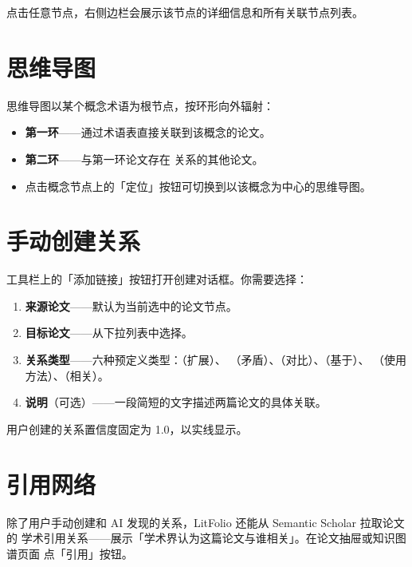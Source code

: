 点击任意节点，右侧边栏会展示该节点的详细信息和所有关联节点列表。

\section{思维导图}


思维导图以某个概念术语为根节点，按环形向外辐射：

\begin{itemize}
  \item \textbf{第一环}——通过术语表直接关联到该概念的论文。
  \item \textbf{第二环}——与第一环论文存在  关系的其他论文。
  \item 点击概念节点上的「定位」按钮可切换到以该概念为中心的思维导图。
\end{itemize}

\section{手动创建关系}

工具栏上的「添加链接」按钮打开创建对话框。你需要选择：

\begin{enumerate}
  \item \textbf{来源论文}——默认为当前选中的论文节点。
  \item \textbf{目标论文}——从下拉列表中选择。
  \item \textbf{关系类型}——六种预定义类型：（扩展）、
    （矛盾）、（对比）、（基于）、
    （使用方法）、（相关）。
  \item \textbf{说明}（可选）——一段简短的文字描述两篇论文的具体关联。
\end{enumerate}

用户创建的关系置信度固定为 1.0，以实线显示。

\section{引用网络}

除了用户手动创建和 AI 发现的关系，LitFolio 还能从 Semantic Scholar 拉取论文的
学术引用关系——展示「学术界认为这篇论文与谁相关」。在论文抽屉或知识图谱页面
点「引用」按钮。


